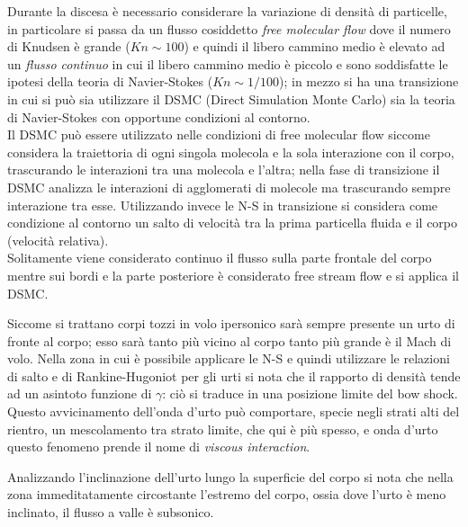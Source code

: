 \documentclass[10pt]{article}
\begin{document}
Durante la discesa è necessario considerare la variazione di densità di particelle, in particolare si passa da un flusso cosiddetto \textit{free molecular flow} dove il numero di Knudsen è grande ($Kn\sim{100}$) e quindi il libero cammino medio è elevato ad un \textit{flusso continuo} in cui il libero cammino medio è piccolo e sono soddisfatte le ipotesi della teoria di Navier-Stokes ($Kn\sim{1/100}$); in mezzo si ha una transizione in cui si può sia utilizzare il DSMC (Direct Simulation Monte Carlo) sia la teoria di Navier-Stokes con opportune condizioni al contorno.\\
Il DSMC può essere utilizzato nelle condizioni di free molecular flow siccome considera la traiettoria di ogni singola molecola e la sola interazione con il corpo, trascurando le interazioni tra una molecola e l'altra; nella fase di transizione il DSMC analizza le interazioni di agglomerati di molecole ma trascurando sempre interazione tra esse. Utilizzando invece le N-S in transizione si considera come condizione al contorno un salto di velocità tra la prima particella fluida e il corpo (velocità relativa). \\
Solitamente viene considerato continuo il flusso sulla parte frontale del corpo mentre sui bordi e la parte posteriore è considerato free stream flow e si applica il DSMC.

Siccome si trattano corpi tozzi in volo ipersonico sarà sempre presente un urto di fronte al corpo; esso sarà tanto più vicino al corpo tanto più grande è il Mach di volo. Nella zona in cui è possibile applicare le N-S e quindi utilizzare le relazioni di salto e di Rankine-Hugoniot per gli urti si nota che il rapporto di densità tende ad un asintoto funzione di $\gamma$: ciò si traduce in una posizione limite del bow shock.\\ Questo avvicinamento dell'onda d'urto può comportare, specie negli strati alti del rientro, un mescolamento tra strato limite, che qui è più spesso, e onda d'urto \textrightarrow  questo fenomeno prende il nome di \textit{ viscous interaction}.

Analizzando l'inclinazione dell'urto lungo la superficie del corpo si nota che nella zona immeditatamente circostante l'estremo del corpo, ossia dove l'urto è meno inclinato, il flusso a valle è subsonico.
\end{document}
